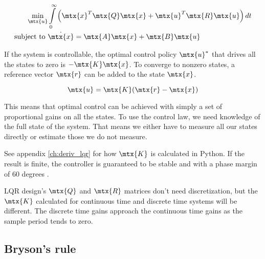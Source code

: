 \begin{theorem}
  \label{thm:linear-quadratic_regulator}

  \begin{align}
    \min_{\mtx{u}} &\int\limits_0^\infty \left(\mtx{x}^T\mtx{Q}\mtx{x} +
      \mtx{u}^T\mtx{R}\mtx{u}\right) dt \nonumber \\
    \text{subject to } &\dot{\mtx{x}} = \mtx{A}\mtx{x} + \mtx{B}\mtx{u}
  \end{align}

  If the \gls{system} is controllable, the optimal control policy $\mtx{u}^*$
  that drives all the \glspl{state} to zero is $-\mtx{K}\mtx{x}$. To converge to
  nonzero \glspl{state}, a \gls{reference} vector $\mtx{r}$ can be added to the
  \gls{state} $\mtx{x}$.

  \begin{equation}
    \mtx{u} = \mtx{K}(\mtx{r} - \mtx{x})
  \end{equation}
\end{theorem}

This means that optimal control can be achieved with simply a set of
proportional gains on all the \glspl{state}. To use the \gls{control law}, we
need knowledge of the full \gls{state} of the \gls{system}. That means we either
have to measure all our \glspl{state} directly or estimate those we do not
measure.

See appendix \ref{ch:deriv_lqr} for how $\mtx{K}$ is calculated in Python. If
the result is finite, the controller is guaranteed to be stable and
 with a \gls{phase margin} of 60 degrees
\cite{bib:lqr_phase_margin}.

\begin{remark}
  LQR design's $\mtx{Q}$ and $\mtx{R}$ matrices don't need \gls{discretization},
  but the $\mtx{K}$ calculated for continuous time and discrete time
  \glspl{system} will be different. The discrete time gains approach the
  continuous time gains as the sample period tends to zero.
\end{remark}

\subsection{Bryson's rule}

